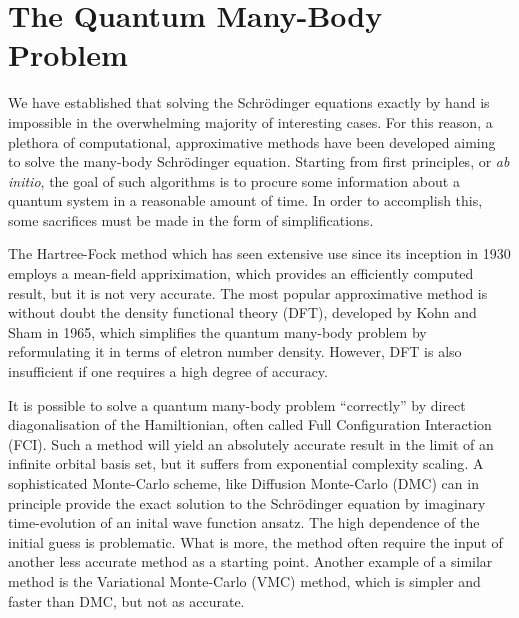 \section{The Quantum Many-Body Problem}

    We have established that solving the Schrödinger equations exactly by hand is 
    impossible in the overwhelming majority of interesting cases. For this reason, 
    a plethora of computational, approximative methods have been developed aiming 
    to solve the many-body Schrödinger equation. Starting from first principles,
    or \emph{ab initio}, the goal of such algorithms is to procure some information
    about a quantum system in a reasonable amount of time. In order to accomplish 
    this, some sacrifices must be made in the form of simplifications. 

    The Hartree-Fock
    method\cite{hartree1928wave,fock1930naherungsmethode,szabo2012modern} which 
    has seen extensive use since its inception in 1930
    employs a mean-field appriximation, which provides an efficiently computed result, 
    but it is not very accurate. The most popular approximative method is without doubt 
    the density functional theory (DFT), developed by Kohn and Sham in
    1965\cite{kohn1965self}, which simplifies the quantum many-body problem by reformulating 
    it in terms of eletron number density. However, DFT is also insufficient if one requires a 
    high degree of accuracy.

    It is possible to solve a quantum many-body problem  ``correctly'' by direct diagonalisation 
    of the Hamiltionian, often called Full Configuration Interaction (FCI). Such a method 
    will yield an absolutely accurate result in the limit of an infinite orbital basis set,
    but it suffers from exponential complexity scaling\cite{helgaker2014molecular}.
    A sophisticated Monte-Carlo scheme, like Diffusion Monte-Carlo (DMC) can in principle 
    provide the exact solution to the Schrödinger equation by imaginary time-evolution 
    of an inital wave function ansatz\cite{hammond1994monte}. The high dependence of the 
    initial guess is problematic. What is more, the method often require the input of
    another less accurate method as a starting point. Another 
    example of a similar method is the Variational Monte-Carlo (VMC) method, which is
    simpler and faster than DMC, but not as accurate.

